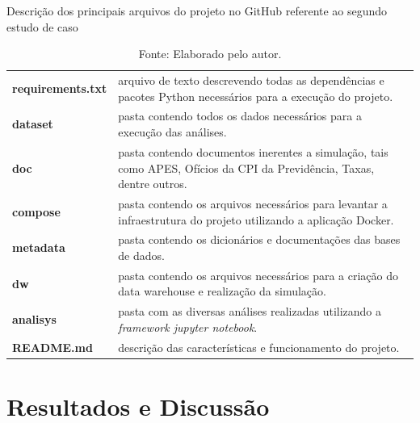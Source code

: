 \begin{table}[!h]
    \centering
    \caption{Descrição dos principais arquivos do projeto no GitHub referente ao segundo estudo de caso} 
    \begin{tabular}{p{}p{}}
    \hline
    \textbf{requirements.txt} & arquivo de texto descrevendo todas as dependências e pacotes Python necessários para a execução do projeto.\vspace{3mm}            \\
    \textbf{dataset}          & pasta contendo todos os dados necessários para a execução das análises.\vspace{3mm}                                                \\
    \textbf{doc}              & pasta contendo documentos inerentes a simulação, tais como APES, Ofícios da CPI da Previdência, Taxas, dentre outros. \vspace{3mm} \\
    \textbf{compose}          & pasta contendo os arquivos necessários para levantar a infraestrutura do projeto utilizando a aplicação Docker. \vspace{3mm}       \\
    \textbf{metadata}         & pasta contendo os dicionários e documentações das bases de dados.\vspace{3mm}                                                      \\
    \textbf{dw}               & pasta contendo os arquivos necessários para a criação do data warehouse e realização da simulação.\vspace{3mm}                     \\
    \textbf{analisys}         & pasta com as diversas análises realizadas utilizando a \textit{framework jupyter notebook}.\vspace{3mm}                            \\          
    \textbf{README.md}        & descrição das características e funcionamento do projeto.                                                                           \\\hline
    \end{tabular}
    \caption*{\footnotesize{Fonte: Elaborado pelo autor.}}
    \label{tab:cap05:github}
\end{table}

\newpage

\section{Resultados e Discussão}\label{cap05:resultados}

